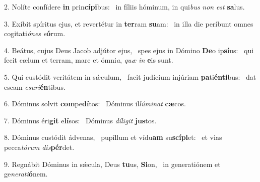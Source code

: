 2. Nolíte confídere \textbf{in} prin\textbf{cí}\textbf{pi}bus: \ast\  in fíliis hóminum, in qui\textit{bus} \textit{non} \textit{est} \textbf{sa}lus.\

3. Exíbit spíritus ejus, et revertétur in \textbf{ter}ram \textbf{su}am: \ast\  in illa die períbunt omnes cogitati\textit{ó}\textit{nes} \textit{e}\textbf{ó}rum.\

4. Beátus, cujus Deus Jacob adjútor ejus, \dag\  spes ejus in Dómino \textbf{De}o ip\textbf{sí}us: \ast\  qui fecit cælum et terram, mare et ómni\textit{a}, \textit{quæ} \textit{in} \textbf{e}is sunt.\

5. Qui custódit veritátem in sǽculum, \dag\  facit judícium injúriam \textbf{pa}ti\textbf{én}\textbf{ti}bus: \ast\  dat escam \textit{e}\textit{su}\textit{ri}\textbf{én}tibus.\

6. Dóminus solvit \textbf{com}pe\textbf{dí}tos: \ast\  Dóminus il\textit{lú}\textit{mi}\textit{nat} \textbf{cæ}cos.\

7. Dóminus éri\textbf{git} e\textbf{lí}sos: \ast\  Dóminus \textit{dí}\textit{li}\textit{git} \textbf{jus}tos.\

8. Dóminus custódit ádvenas, \dag\  pupíllum et vídu\textbf{am} su\textbf{scí}\textbf{pi}et: \ast\  et vias pecca\textit{tó}\textit{rum} \textit{dis}\textbf{pér}det.\

9. Regnábit Dóminus in sǽcula, Deus \textbf{tu}us, \textbf{Si}on, \ast\  in generatiónem et ge\textit{ne}\textit{ra}\textit{ti}\textbf{ó}nem.\

